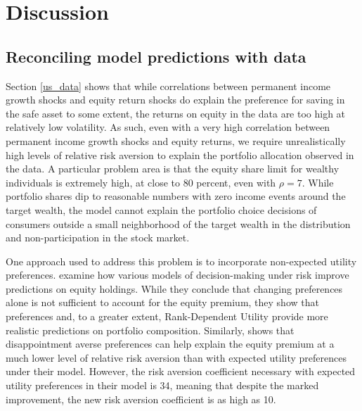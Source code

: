 \section{Discussion}\label{discussion}

\subsection{Reconciling model predictions with data}\label{reconciliation}

Section \ref{us_data} shows that while correlations between permanent income growth shocks and equity return shocks do explain the preference for saving in the safe asset to some extent, the returns on equity in the data are too high at relatively low volatility. As such, even with a very high correlation between permanent income growth shocks and equity returns, we require unrealistically high levels of relative risk aversion to explain the portfolio allocation observed in the data. A particular problem area is that the equity share limit for wealthy individuals is extremely high, at close to 80 percent, even with $\rho = 7$. While portfolio shares dip to reasonable numbers with zero income events around the target wealth, the model cannot explain the portfolio choice decisions of consumers outside a small neighborhood of the target wealth in the distribution and non-participation in the stock market.

One approach used to address this problem is to incorporate non-expected utility preferences. \citet{Haliassos2001} examine how various models of decision-making under risk improve predictions on equity holdings. While they conclude that changing preferences alone is not sufficient to account for the equity premium, they show that \citet{Kreps1978} preferences and, to a greater extent, Rank-Dependent Utility \citep{Quiggin1982} provide more realistic predictions on portfolio composition. Similarly, \citet{Schreindorfer2020} shows that disappointment averse preferences \citep{Gul1991, Routledge2010} can help explain the equity premium at a much lower level of relative risk aversion than with expected utility preferences under their model. However, the risk aversion coefficient necessary with expected utility preferences in their model is 34, meaning that despite the marked improvement, the new risk aversion coefficient is as high as 10.

